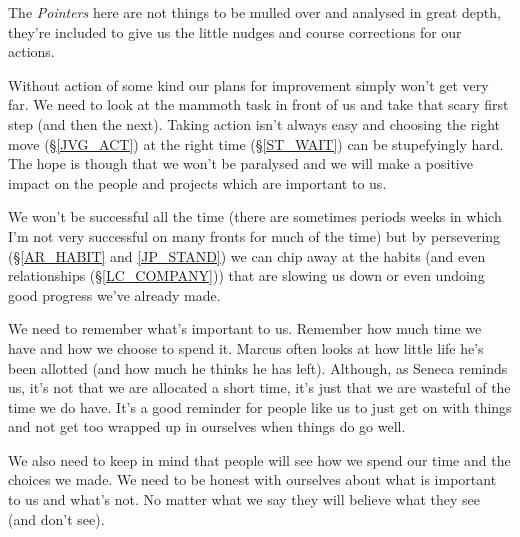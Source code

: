 \cleardoublepage
{\small

The \emph{Pointers} here are not things to be mulled over and analysed in great depth, they're included to give us the little nudges and course corrections for our actions.

Without action of some kind our plans for improvement simply won't get very far. We need to look at the mammoth task in front of us and take that scary first step (and then the next). 
Taking action isn't always easy and choosing the right move (\S \ref{JVG_ACT}) at the right time (\S \ref{ST_WAIT}) can be stupefyingly hard.
The hope is though that we won't be paralysed and we will make a positive impact on the people and projects which are important to us.

We won't be successful all the time (there are sometimes periods weeks in which I'm not very successful on many fronts for much of the time) but by persevering (\S \ref{AR_HABIT} and \ref{JP_STAND}) we can chip away at the habits (and even relationships (\S \ref{LC_COMPANY})) that are slowing us down or even undoing good progress we've already made.

We need to remember what's important to us. Remember how much time we have and how we choose to spend it. Marcus often looks at how little life he's been allotted (and how much he thinks he has left). Although, as Seneca reminds us, it's not that we are allocated a short time, it's just that we are wasteful of the time we do have. It's a good reminder for people like us to just get on with things and not get too wrapped up in ourselves when things do go well. 

We also need to keep in mind that people will see how we spend our time and the choices we made. We need to be honest with ourselves about what is important to us and what's not. No matter what we say they will believe what they see (and don't see). 

}
